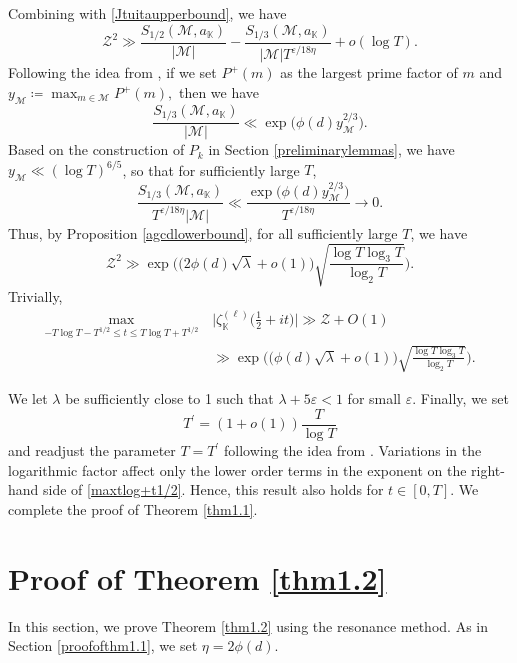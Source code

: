 \documentclass[12pt,reqno]{amsart}
\theoremstyle{definition}
\numberwithin{equation}{section}
\newcommand{\mbk}{\mathbb{K}}
\newcommand{\mcm}{\mathcal{M}}
\newcommand{\mcz}{\mathcal{Z}}
\begin{document}
\par
Combining with \eqref{Jtuitaupperbound}, we have
$$
\mcz^2  \gg \frac{S_{1/2}(\mcm, a_\mbk)}{|\mcm|} - \frac{S_{1/3}(\mcm, a_\mbk)}{|\mcm|T^{\varepsilon/18\eta}} + o(\log T).
$$
Following the idea from \cite{tenen2019galsum}, if we set $P^+ (m)$ as the largest prime factor of $m$ and $y_{\mcm} \coloneqq \max_{m \in \mcm} P^+(m),$ then we have 
$$\frac{S_{1/3}(\mcm, a_\mbk)}{|\mcm|} \ll \exp \Big(\phi(d) y_\mcm^{2/3}\Big).$$
Based on the construction of $P_k$ in Section \ref{preliminarylemmas}, we have $y_\mcm \ll (\log T)^{6/5}$, so that for sufficiently large $T$, 
$$
\frac{S_{1/3}(\mcm, a_\mbk)}{T^{\varepsilon/18\eta}|\mcm|} \ll \frac{\exp\Big(\phi(d) y_\mcm^{2/3}\Big)}{T^{\varepsilon/18\eta}} \to 0.
$$
Thus, by Proposition \ref{agcdlowerbound}, for all sufficiently large $T$, we have 
$$
\mcz^2 \gg \exp \bigg(\Big(2\phi(d)\sqrt{\lambda}+o(1)\Big)\sqrt{\frac{\log T\log_3 T}{\log_2 T}}\bigg).
$$
Trivially, 
\begin{align}
\label{maxtlog+t1/2}
    \max_{-T \log T - T^{1/2}\le t\le T \log T +T^{1/2}}&\,\Big|\zeta_\mbk^{(\ell)}\Big(\frac{1}{2}+it\Big)\Big| \gg \mcz + O(1) \nonumber \\
    &\, \gg \exp\bigg(\Big(\phi(d)\sqrt{\lambda}+o(1)\Big)\sqrt{\frac{\log T\log_3 T}{\log_2 T}}\bigg).
\end{align}
\par
We let $\lambda$ be sufficiently close to 1 such that $\lambda + 5\varepsilon <1$ for small $\varepsilon$. Finally, we set 
$$T^{\prime}=(1+o(1))\frac{T}{\log T}$$
and readjust the parameter $T=T^{\prime}$ following the idea from \cite{bondarenko2023dichotomy}. Variations in the logarithmic factor affect only the lower order terms in the exponent on the right-hand side of \eqref{maxtlog+t1/2}. Hence, this result also holds for $t \in [0,T]$. We complete the proof of Theorem \ref{thm1.1}.

\section{Proof of Theorem \ref{thm1.2}}
\label{proofofthm1.2}
In this section, we prove Theorem \ref{thm1.2} using the resonance method. As in Section \ref{proofofthm1.1}, we set $\eta = 2 \phi(d)$.
\end{document}
